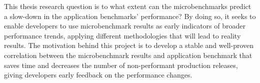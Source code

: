 This thesis research question is to what extent can the microbenchmarks predict a slow-down in the application benchmarks’ performance? By doing so, it seeks to enable developers to use microbenchmark results as early indicators of broader performance trends, applying different methodologies that will lead to reality results. The motivation behind this project is to develop a stable and well-proven correlation between the microbenchmark results and application benchmark that saves time and decreases the number of non-performant production releases, giving developers early feedback on the performance changes. 